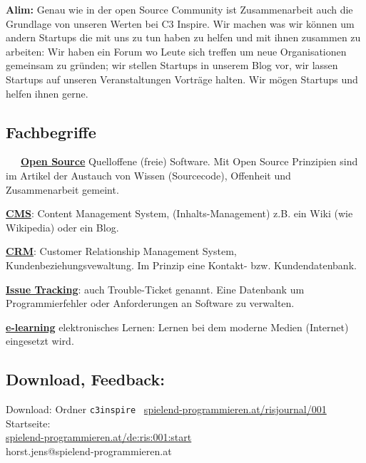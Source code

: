 \documentclass[10pt,a4paper,ngerman,twoside]{article} %
\begin{document}
\begin{multicols}{3}
\textbf{Alim:} Genau wie in der open Source Community ist Zusammenarbeit auch 
die Grundlage von unseren Werten bei C3 Inspire. Wir machen was wir 
können um andern Startups die mit uns zu tun haben zu helfen und mit 
ihnen zusammen zu arbeiten: Wir haben ein Forum wo Leute sich treffen 
um neue Organisationen gemeinsam zu gründen; wir stellen Startups in 
unserem Blog vor,  wir lassen Startups auf unseren Veranstaltungen 
Vorträge halten. Wir mögen Startups und helfen ihnen gerne.


\subsection*{Fachbegriffe}
~~~\href{https://de.wikipedia.org/wiki/Portal:Freie_Software}{\textbf{Open Source}} Quelloffene (freie) Software. Mit Open Source Prinzipien sind im Artikel der Austauch von Wissen (Sourcecode), Offenheit und Zusammenarbeit gemeint. 

\href{https://de.wikipedia.org/wiki/Content-Management-System}{\textbf{CMS}}: Content Management System, (Inhalts-Management) z.B. ein Wiki (wie Wikipedia) oder ein Blog. 

\href{https://de.wikipedia.org/wiki/Customer-Relationship-Management}{\textbf{CRM}}: Customer Relationship Management System, Kundenbeziehungsvewaltung. Im Prinzip eine Kontakt- bzw. Kundendatenbank.

\href{https://de.wikipedia.org/wiki/Issue-Tracking-System}{\textbf{Issue Tracking}}: auch Trouble-Ticket genannt. Eine Datenbank um Programmierfehler oder Anforderungen an Software zu verwalten. 

\href{https://de.wikipedia.org/wiki/ELearning}{\textbf{e-learning}} elektronisches Lernen: Lernen bei dem moderne Medien (Internet) eingesetzt wird.

\subsection*{Download, Feedback:}
\footnotesize{
Download: Ordner \texttt{c3inspire} \Mundus\ \href{http://spielend-programmieren.at/risjournal/001}{spielend-programmieren.at/risjournal/001}\\
Startseite:\\
\href{http://spielend-programmieren.at/de:ris:001:start}{spielend-programmieren.at/de:ris:001:start}\\ 
\Letter\: horst.jens@spielend-programmieren.at}
\normalsize


\end{multicols}
\end{document}
